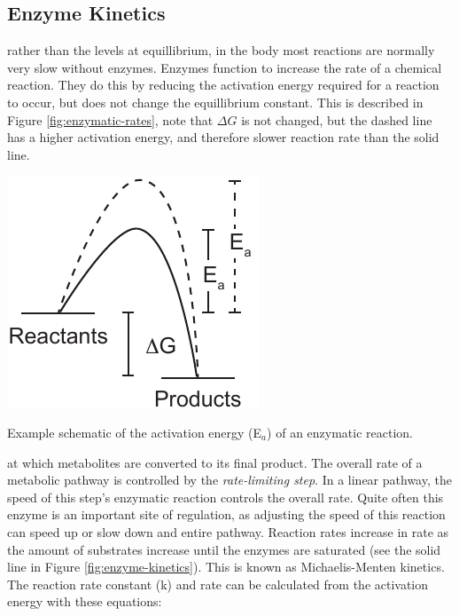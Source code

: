 \documentclass{tufte-handout}
\begin{document}
\subsection{Enzyme Kinetics}

 rather than the levels at equillibrium, in the body most reactions are normally very slow without enzymes.  Enzymes function to increase the rate of a chemical reaction.  They do this by reducing the activation energy required for a reaction to occur, but does not change the equillibrium constant.  This is described in Figure \ref{fig:enzymatic-rates}, note that $\Delta G$ is not changed, but the dashed line has a higher activation energy, and therefore slower reaction rate than the solid line.  

\begin{marginfigure}
\includegraphics[width=\marginparwidth]{figures/enzymatic-rates.pdf}\
\caption{Example schematic of the activation energy (E$_a$) of an enzymatic reaction.}
\label{fig:enzymatic-rates}
\end{marginfigure}

 at which metabolites are converted to its final product. The overall rate of a metabolic pathway is controlled by the \emph{rate-limiting step}.  In a linear pathway, the speed of this step's enzymatic reaction controls the overall rate.  Quite often this enzyme is an important site of regulation, as adjusting the speed of this reaction can speed up or slow down and entire pathway.  Reaction rates increase in rate as the amount of substrates increase until the enzymes are saturated (see the solid line in Figure \ref{fig:enzyme-kinetics}).  This is known as Michaelis-Menten kinetics.  The reaction rate constant (k) and rate can be calculated from the activation energy with these equations:
\end{document}
